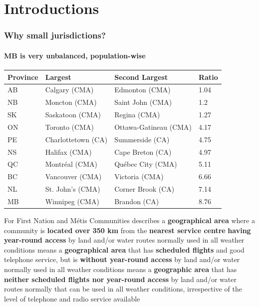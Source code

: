 \documentclass[aspectratio=169]{beamer}\usepackage[]{graphicx}\usepackage[]{xcolor}
\begin{document}
\section{Introductions}

\begin{frame}\frametitle{Why small jurisdictions?}
\framesubtitle{MB is very unbalanced, population-wise}
\centering
\begin{tabular}{llll}
	\toprule
	Province & Largest & Second Largest & Ratio \\
	\midrule
	AB & Calgary (CMA) & Edmonton (CMA) & 1.04 \\
	NB & Moncton (CMA) & Saint John (CMA) & 1.2 \\
	SK & Saskatoon (CMA) & Regina (CMA) & 1.27 \\
	ON & Toronto (CMA) & Ottawa-Gatineau (CMA) & 4.17 \\
	PE & Charlottetown (CA) & Summerside (CA) & 4.75 \\
	NS & Halifax (CMA) & Cape Breton (CA) & 4.97 \\
	QC & Montréal (CMA) & Québec City (CMA) & 5.11 \\
	BC & Vancouver (CMA) & Victoria (CMA) & 6.66 \\
	NL & St. John's (CMA) & Corner Brook (CA) & 7.14 \\
	MB & Winnipeg (CMA) & Brandon (CA) & 8.76 \\
	\bottomrule
	\end{tabular}
\end{frame}




\begin{frame}{For First Nation and Métis Communities}
	 describes a \textbf{geographical area} where a community is \textbf{located over 350 km} from the \textbf{nearest service centre} \textbf{having year-round access} by land and/or water routes normally used in all weather conditions
	\vfill	
	 means a \textbf{geographical area} that has \textbf{scheduled flights} and good telephone service, but is \textbf{without year-round access} by land and/or water normally used in all weather conditions
	\vfill
	 means a \textbf{geographic area} that has \textbf{neither scheduled flights nor year-round access} by land and/or water routes normally that can be used in all weather conditions, irrespective of the level of telephone and radio service available
\end{frame}
\end{document}
